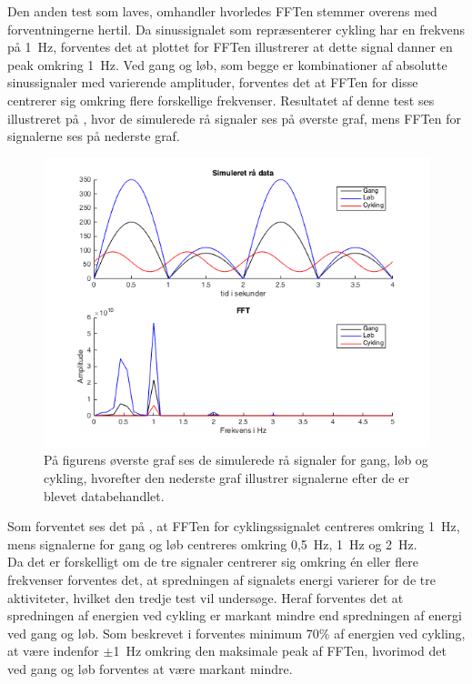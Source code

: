 Den anden test som laves, omhandler hvorledes FFTen stemmer overens med forventningerne hertil. Da sinussignalet som repræsenterer cykling har en frekvens på 1~Hz, forventes det at plottet for FFTen illustrerer at dette signal danner en peak omkring 1~Hz. Ved gang og løb, som begge er kombinationer af absolutte sinussignaler med varierende amplituder, forventes det at FFTen for disse centrerer sig omkring flere forskellige frekvenser. Resultatet af denne test ses illustreret på , hvor de simulerede rå signaler ses på øverste graf, mens FFTen for signalerne ses på nederste graf.
\begin{figure}[H]
	\centering
	\includegraphics[width=.9\textwidth]{figures/cDesign/sim_gyro.png}
	\caption{På figurens øverste graf ses de simulerede rå signaler for gang, løb og cykling, hvorefter den nederste graf illustrer signalerne efter de er blevet databehandlet.}
	\label{fig:sim_gyro}
\end{figure}
Som forventet ses det på , at FFTen for cyklingssignalet centreres omkring 1~Hz, mens signalerne for gang og løb centreres omkring 0,5~Hz, 1~Hz og 2~Hz.\\ 
Da det er forskelligt om de tre signaler centrerer sig omkring én eller flere frekvenser forventes det, at spredningen af signalets energi varierer for de tre aktiviteter, hvilket den tredje test vil undersøge. Heraf forventes det at spredningen af energien ved cykling er markant mindre end spredningen af energi ved gang og løb. Som beskrevet i  forventes minimum 70\% af energien ved cykling, at være indenfor $\pm$1~Hz omkring den maksimale peak af FFTen, hvorimod det ved gang og løb forventes at være markant mindre. 

